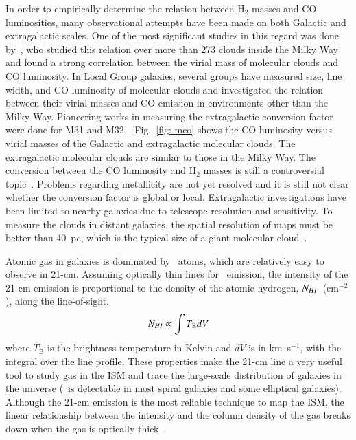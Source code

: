 In order to empirically determine the relation between H$_2$ masses and CO luminosities, many observational attempts have been made on both Galactic and extragalactic scales. 
One of the most significant studies in this regard was done by~\cite{Solomon87}, who studied this relation over more than 273 clouds inside the Milky Way and found a strong correlation between the virial mass of molecular clouds and CO luminosity. 
In Local Group galaxies, several groups have measured size, line width, and CO luminosity of molecular clouds and investigated the relation between  their virial masses and CO emission in environments other than the Milky Way. 
Pioneering works in measuring the extragalactic conversion factor were done for M31 and M32~\citep[e.g.,][]{Wilson89, Wilson90}. 
Fig.~\ref{fig: mco} shows the CO luminosity versus virial masses of the Galactic and extragalactic molecular clouds. 
The extragalactic molecular clouds are similar to those in the Milky Way. 
The conversion between the CO luminosity and H$_2$ masses is still a controversial topic~\citep[e.g.][]{Narayanan11, Bolato13, Sandstrom13}.
Problems regarding metallicity are not yet resolved and it is still not clear whether the conversion factor is global or local. 
Extragalactic investigations have been limited to nearby galaxies due to telescope resolution and sensitivity. 
To measure the clouds in distant galaxies, the spatial resolution of maps must be better than 40~pc, which is the typical size of a giant molecular cloud~\citep[e.g.][and references therein]{Young91,Bolato13}. 

Atomic gas in galaxies is dominated by \hi~atoms, which are relatively easy to observe in 21-cm.
Assuming optically thin lines for \hi~emission, the intensity of the 21-cm emission is proportional to the density of the atomic hydrogen, $N_{H {\sc I}}$~(cm$^{-2}$), along the line-of-sight.
\begin{equation}
N_{H {\sc I}}  \propto \int T_{\mathrm B} dV
\end{equation}
where $T_{\mathrm B}$ is the brightness temperature  in Kelvin and $dV$ is in km~s$^{-1}$, with the integral over the line profile. 
These properties make the 21-cm line a very useful tool to study gas in the ISM and trace the large-scale distribution of galaxies in the universe (\hi~is detectable in most spiral galaxies and some elliptical galaxies).
Although the 21-cm emission is the most reliable technique to map the ISM, the linear relationship between the intensity and the column density of the gas breaks down when the gas is optically thick~\citep{Braun09}. 

